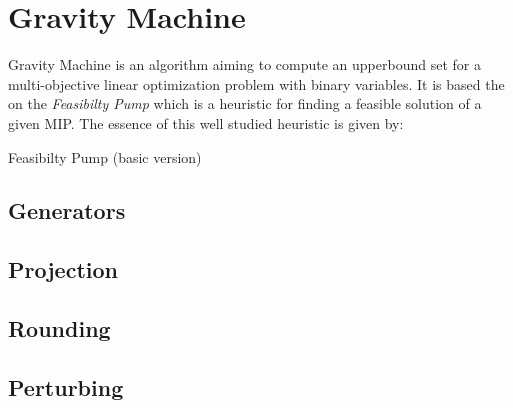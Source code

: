 \section{Gravity Machine}
Gravity Machine is an algorithm aiming to compute an upperbound set for a multi-objective linear optimization problem with binary variables.
It is based the on the \textit{Feasibilty Pump} \cite{FeasibilityPump} which is a heuristic for finding a feasible solution of a given MIP.
The essence of this well studied heuristic \cite{ten_years_fp} is given by:

\begin{algorithm}[h!]
    \caption{Feasibilty Pump (basic version)}
\end{algorithm}

\subsection{Generators}
\subsection{Projection}
\subsection{Rounding}
\subsection{Perturbing}

